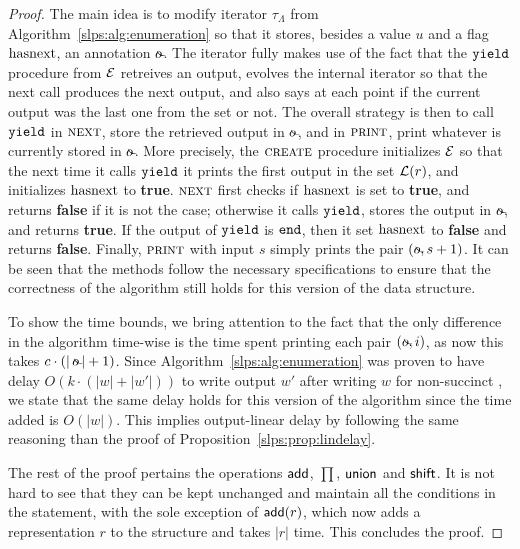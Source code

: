\begin{proof}
		The main idea is to modify iterator $\tau_\Lambda$ from Algorithm~\ref{slps:alg:enumeration} so that it stores, besides a value $u$ and a flag $\operatorname{hasnext}$, an annotation $\oout$. The iterator fully makes use of the fact that the ${\tt yield}$ procedure from $\mathcal{E}$ retreives an output, evolves the internal iterator so that the next call produces the next output, and also says at each point if the current output was the last one from the set or not. The overall strategy is then to call ${\tt yield}$ in $\textsc{next}$, store the retrieved output in $\oout$, and in $\textsc{print}$, print whatever is currently stored in $\oout$. More precisely, the $\textsc{create}$ procedure initializes $\mathcal{E}$ so that the next time it calls ${\tt yield}$ it prints the first output in the set $\mathcal{L}(r)$, and initializes $\operatorname{hasnext}$ to {\bf true}. $\textsc{next}$ first checks if $\operatorname{hasnext}$ is set to {\bf true}, and returns {\bf false} if it is not the case; otherwise it calls ${\tt yield}$, stores the output in $\oout$, and returns {\bf true}. If the output of ${\tt yield}$ is ${\tt end}$, then it set $\operatorname{hasnext}$ to  {\bf false} and returns {\bf false}.   Finally, $\textsc{print}$ with input $s$ simply prints the pair $(\oout, s+1)$. It can be seen that the methods follow the necessary specifications to ensure that the correctness of the algorithm still holds for this version of the data structure.
		
		To show the time bounds, we bring attention to the fact that the only difference in the algorithm time-wise is the time spent printing each pair $(\oout, i)$, as now this takes $c \cdot (|\oout| + 1)$. Since Algorithm~\ref{slps:alg:enumeration} was proven to have delay $O(k\cdot(|w|+|w'|))$ to write output $w'$ after writing $w$ for non-succinct \dsabbr, we state that the same delay holds for this version of the algorithm since the time added is $O(|w|)$. This implies output-linear delay by following the same reasoning than the proof of Proposition~\ref{slps:prop:lindelay}.
		
		The rest of the proof pertains the operations $\mathsf{add}$, $\prod$, $\mathsf{union}$ and $\mathsf{shift}$. It is not hard to see that they can be kept unchanged and maintain all the conditions in the statement, with the sole exception of $\mathsf{add}(r)$, which now adds a representation $r$ to the structure and takes $|r|$ time. This concludes the proof. 
	\end{proof}
	

